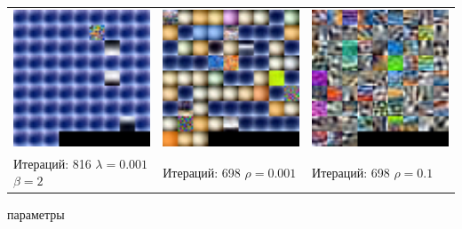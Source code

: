 \documentclass[12pt, a4paper]{article}
\begin{document}
\begin{center}
\begin{tabular}{l l l}
				\includegraphics[width=5cm]{hidden_10000it_816it_l=0-001_b=2.png} &
				\includegraphics[width=5cm]{hidden_10000it_698it_spars=0-001.png} &
				\includegraphics[width=5cm]{hidden_10000it_698it_spars=0-1.png} \\

				\pbox{5cm}{Итераций: 816\\ $\lambda = 0.001$ $\beta = 2$ \\} &
				\pbox{5cm}{Итераций: 698\\ $\rho = 0.001$ \\} &
				\pbox{5cm}{Итераций: 698\\ $\rho = 0.1$ \\} \\
			\end{tabular}

			{ параметры \\}


\end{center}
\end{document}
